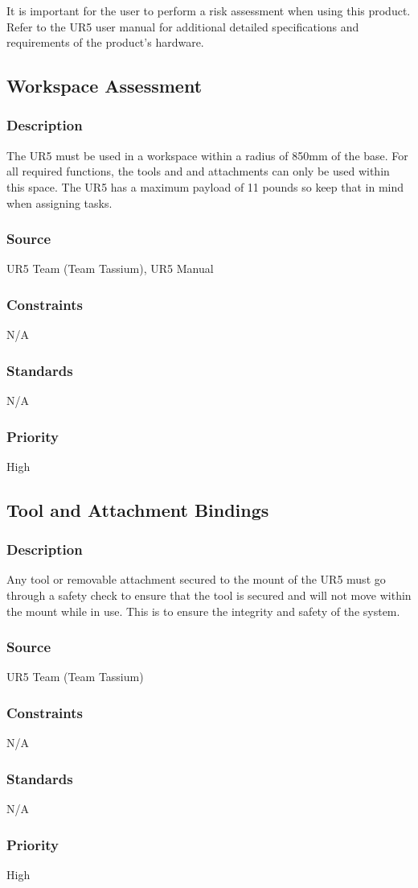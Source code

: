 It is important for the user to perform a risk assessment when using this product. Refer to the UR5 user manual for additional detailed specifications and requirements of the product's hardware. 

\subsection{Workspace Assessment}
\subsubsection{Description}
The UR5 must be used in a workspace within a radius of 850mm of the base. For all required functions, the tools and and attachments can only be used within this space. The UR5 has a maximum payload of 11 pounds so keep that in mind when assigning tasks.
\subsubsection{Source}
UR5 Team (Team Tassium), UR5 Manual
\subsubsection{Constraints}
N/A
\subsubsection{Standards}
N/A
\subsubsection{Priority}
High

\subsection{Tool and Attachment Bindings}
\subsubsection{Description}
Any tool or removable attachment secured to the mount of the UR5 must go through a safety check to ensure that the tool is secured and will not move within the mount while in use. This is to ensure the integrity and safety of the system.
\subsubsection{Source}
UR5 Team (Team Tassium)
\subsubsection{Constraints}
N/A
\subsubsection{Standards}
N/A
\subsubsection{Priority}
High
